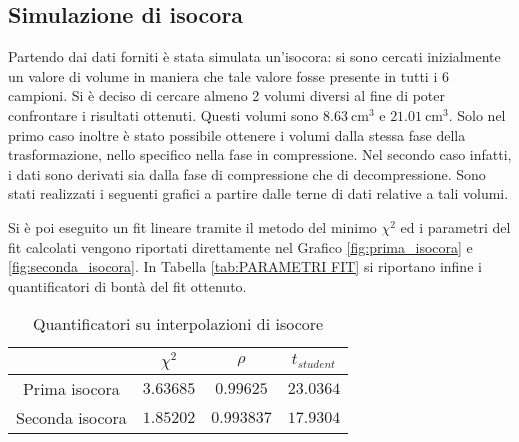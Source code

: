 \documentclass[a4paper,11pt,oneside]{article}
\begin{document}
\subsection{Simulazione di isocora}
Partendo dai dati forniti è stata simulata un'isocora: si sono cercati inizialmente un valore di volume in maniera che tale valore fosse presente in tutti i 6 campioni. Si è deciso di cercare almeno 2 volumi diversi al fine di poter confrontare i risultati ottenuti. Questi volumi sono $\SI{8.63}{\centi\meter\cubed}$ e $\SI{21.01}{\centi\meter\cubed}$. Solo nel primo caso inoltre è stato possibile ottenere i volumi dalla stessa fase della trasformazione, nello specifico nella fase in compressione. Nel secondo caso infatti, i dati sono derivati sia dalla fase di compressione che di decompressione.
Sono stati realizzati i seguenti grafici a partire dalle terne di dati relative a tali volumi.
\begin{figure}[h!]
    \centering
    \label{fig:isocore}
\end{figure}
Si è poi eseguito un fit lineare tramite il metodo del minimo $\chi^2$ ed i parametri del fit calcolati vengono riportati direttamente nel Grafico \ref{fig:prima_isocora} e \ref{fig:seconda_isocora}. In Tabella \ref{tab:PARAMETRI FIT} si riportano infine i quantificatori di bontà del fit ottenuto.

\begin{table}[h!]
    \centering
    \begin{tabular}{|c|c|c|c|}
        \hline
         & $\chi^2$ & $\rho$ & $t_{student}$ \\ \hline
        Prima isocora & \rowcolor[rgb]{0.85,0.85,0.85}$3.63685$ & $0.99625$ & $23.0364$ \\ \hline
        Seconda isocora & $1.85202$ & $0.993837$ & $17.9304$ \\ \hline
    \end{tabular}
    \caption{Quantificatori su interpolazioni di isocore}
    \label{tab:my_label}
\end{table}
\end{document}
